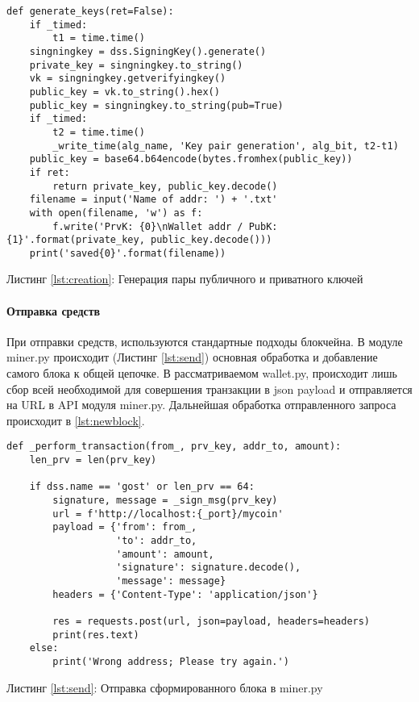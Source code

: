 \begin{center}
\begin{lstlisting}
def generate_keys(ret=False):
    if _timed:
        t1 = time.time()
    singningkey = dss.SigningKey().generate()
    private_key = singningkey.to_string()
    vk = singningkey.getverifyingkey()
    public_key = vk.to_string().hex()
    public_key = singningkey.to_string(pub=True)
    if _timed:
        t2 = time.time()
        _write_time(alg_name, 'Key pair generation', alg_bit, t2-t1)
    public_key = base64.b64encode(bytes.fromhex(public_key))
    if ret:
        return private_key, public_key.decode()
    filename = input('Name of addr: ') + '.txt'
    with open(filename, 'w') as f:
        f.write('PrvK: {0}\nWallet addr / PubK: {1}'.format(private_key, public_key.decode()))
    print('saved{0}'.format(filename))
\end{lstlisting}\label{lst:creation}
    Листинг \ref{lst:creation}: Генерация пары публичного и приватного ключей
\end{center}



\paragraph{Отправка средств}
При отправки средств, используются стандартные подходы блокчейна. В модуле
{\small miner.py} происходит (Листинг \ref{lst:send}) основная обработка и
добавление самого блока к общей цепочке. В рассматриваемом {\small wallet.py},
происходит лишь сбор всей необходимой для совершения транзакции в json payload
и отправляется на URL в API модуля {\small miner.py}. Дальнейшая обработка
отправленного запроса происходит в \ref{lst:newblock}.

\begin{center}
\begin{lstlisting}
def _perform_transaction(from_, prv_key, addr_to, amount):
    len_prv = len(prv_key)

    if dss.name == 'gost' or len_prv == 64:
        signature, message = _sign_msg(prv_key)
        url = f'http://localhost:{_port}/mycoin'
        payload = {'from': from_,
                   'to': addr_to,
                   'amount': amount,
                   'signature': signature.decode(),
                   'message': message}
        headers = {'Content-Type': 'application/json'}

        res = requests.post(url, json=payload, headers=headers)
        print(res.text)
    else:
        print('Wrong address; Please try again.')
\end{lstlisting}\label{lst:send}
    Листинг \ref{lst:send}: Отправка сформированного блока в {\small miner.py}
\end{center}


